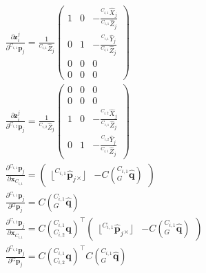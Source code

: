 \begin{equation}
\label{eq: measurment jacobian expression}
\begin{gathered}
\frac{\partial \mathbf{z}_i^j}{\partial {}^{C_{i,1}}\mathbf{p}_j} = 
\frac{1}{{}^{C_{i, 1}}\hat{Z}_j}
\begin{pmatrix}
1 & 0 & -\frac{{}^{C_{i, 1}}\hat{X}_j}{{}^{C_{i, 1}}\hat{Z}_j} \\
0 & 1 & -\frac{{}^{C_{i, 1}}\hat{Y}_j}{{}^{C_{i, 1}}\hat{Z}_j} \\
0 & 0 & 0 \\
0 & 0 & 0 
\end{pmatrix} \\
\frac{\partial \mathbf{z}_i^j}{\partial {}^{C_{i,2}}\mathbf{p}_j} = 
\frac{1}{{}^{C_{i, 2}}\hat{Z}_j}
\begin{pmatrix}
0 & 0 & 0 \\
0 & 0 & 0 \\
1 & 0 & -\frac{{}^{C_{i, 2}}\hat{X}_j}{{}^{C_{i, 1}}\hat{Z}_j} \\
0 & 1 & -\frac{{}^{C_{i, 2}}\hat{Y}_j}{{}^{C_{i, 1}}\hat{Z}_j} 
\end{pmatrix} \\
\frac{\partial {}^{C_{i,1}}\mathbf{p}_j}{\partial \mathbf{x}_{C_{i,1}}} = 
\begin{pmatrix}
\lfloor{}^{C_{i,1}}\hat{\mathbf{p}}_j{}_{\times}\rfloor & 
-C\left({}^{C_{i,1}}_G\hat{\mathbf{q}}\right)
\end{pmatrix} \\
\frac{\partial {}^{C_{i,1}}\mathbf{p}_j}{\partial {}^G\mathbf{p}_j} = 
C\left({}^{C_{i,1}}_G\hat{\mathbf{q}}\right) \\
\frac{\partial {}^{C_{i,2}}\mathbf{p}_j}{\partial \mathbf{x}_{C_{i,1}}} = 
C\left({}^{C_{i,1}}_{C_{i,2}}\mathbf{q}\right)^\top
\begin{pmatrix}
\lfloor{}^{C_{i,1}}\hat{\mathbf{p}}_j{}_{\times}\rfloor & 
-C\left({}^{C_{i,1}}_G\hat{\mathbf{q}}\right)
\end{pmatrix} \\
\frac{\partial {}^{C_{i,2}}\mathbf{p}_j}{\partial {}^G\mathbf{p}_j} = 
C\left({}^{C_{i,1}}_{C_{i,2}}\mathbf{q}\right)^\top
C\left({}^{C_{i,1}}_G\hat{\mathbf{q}}\right)
\end{gathered}
\end{equation}

